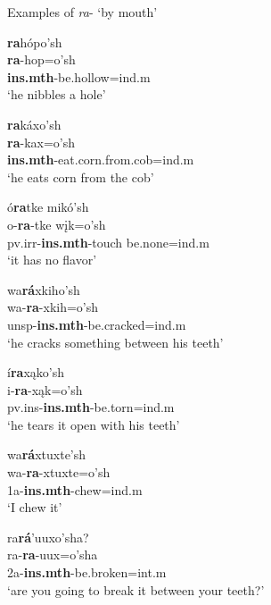 \begin{exe}
\item\label{ra2examples} Examples of \textit{ra}- `by mouth'

	\begin{xlist}
	
	\item \glll \textbf{ra}hópo'sh\\
	\textbf{ra}-hop=o'sh\\
	\textbf{ins.mth}-\textnormal{be.hollow}=ind.m\\
	\glt `he nibbles a hole' \citep[77]{hollow1970}

	\item \glll \textbf{ra}káxo'sh\\
	\textbf{ra}-kax=o'sh\\
	\textbf{ins.mth}-\textnormal{eat.corn.from.cob}=ind.m\\
	\glt	`he eats corn from the cob' \citep[104]{hollow1970}

	\item \glll ó\textbf{ra}tke mikó'sh\\
	o-\textbf{ra}-tke wįk=o'sh\\
	pv.irr-\textbf{ins.mth}-\textnormal{touch} \textnormal{be.none}=ind.m\\
	\glt `it has no flavor' \citep[138]{hollow1973b}

	\item \glll wa\textbf{rá}xkiho'sh\\
	wa-\textbf{ra}-xkih=o'sh\\
	unsp-\textbf{ins.mth}-\textnormal{be.cracked}=ind.m\\
	\glt `he cracks something between his teeth' \citep[465]{hollow1970}

	\item \glll í\textbf{ra}xąko'sh\\
	i-\textbf{ra}-xąk=o'sh\\
	pv.ins-\textbf{ins.mth}-\textnormal{be.torn}=ind.m\\
	\glt `he tears it open with his teeth' \citep[309]{hollow1970}
	
	\item \glll wa\textbf{rá}xtuxte'sh\\
	wa-\textbf{ra}-xtuxte=o'sh\\
	1a-\textbf{ins.mth}-\textnormal{chew}=ind.m\\
	\glt `I chew it' \citep[330]{hollow1970}

	\item \glll ra\textbf{rá}'uuxo'sha?\\
	ra-\textbf{ra}-uux=o'sha\\
	2a-\textbf{ins.mth}-\textnormal{be.broken}=int.m\\
	\glt `are you going to break it between your teeth?' \citep[465]{hollow1970}
	
	\end{xlist}


\end{exe}

